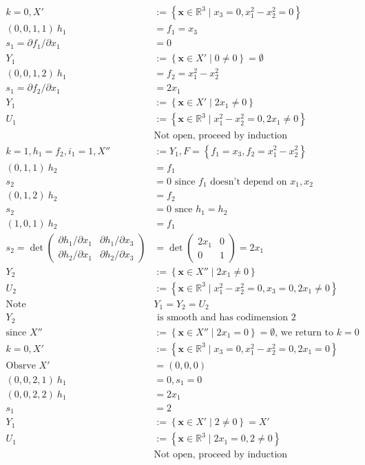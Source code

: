 \documentclass[
]{book}
\theoremstyle{definition}
\theoremstyle{definition}
\theoremstyle{definition}
\theoremstyle{definition}
\theoremstyle{remark}
\begin{document}
\begin{align}
k=0,X'&:=\left\{ \mathbf{x}\in\mathbb{R}^{3}\mid x_{3}=0,x_{1}^{2}-x_{2}^{2}=0\right\} \\\left(0,0,1,1\right)\ h_{1}&=f_{1}=x_{3}\\s_{1}=\partial f_{1}/\partial x_{1}&=0\\Y_{1}&:=\left\{ \mathbf{x}\in X'\mid0\ne0\right\} =\emptyset\\(0,0,1,2)\ h_{1}&=f_{2}=x_{1}^{2}-x_{2}^{2}\\s_{1}=\partial f_{2}/\partial x_{1}&=2x_{1}\\Y_{1}&:=\left\{ \mathbf{x}\in X'\mid2x_1\ne0\right\} \\U_{1}&:=\left\{ \mathbf{x}\in\mathbb{R}^{3}\mid x_{1}^{2}-x_{2}^{2}=0,2x_{1}\ne0\right\} \\&\text{Not open, proceed by induction}\\
k=1,h_{1}=f_{2},i_{1}=1,X''&:=Y_{1},F=\left\{ f_{1}=x_{3},f_{2}=x_{1}^{2}-x_{2}^{2}\right\} \\\left(0,1,1\right)\ h_{2}&=f_{1}\\s_{2}&=0\text{ since }f_{1}\text{ doesn't depend on }x_{1},x_{2}\\\left(0,1,2\right)\ h_{2}&=f_{2}\\s_{2}&=0\text{ snce }h_{1}=h_{2}\\\left(1,0,1\right)\ h_{2}&=f_{1}\\s_{2}=\det\begin{pmatrix}\partial h_{1}/\partial x_{1} & \partial h_{1}/\partial x_{3}\\
\partial h_{2}/\partial x_{1} & \partial h_{2}/\partial x_{3}
\end{pmatrix}&=\det\begin{pmatrix}2x_{1} & 0\\
0 & 1
\end{pmatrix}=2x_{1}\\Y_{2}&:=\left\{ \mathbf{x}\in X''\mid2x_{1}\ne0\right\}\\U_{2}&:=\left\{ \mathbf{x}\in\mathbb{R}^{3}\mid x_{1}^{2}-x_{2}^{2}=0,x_{3}=0,2x_{1}\ne0\right\} \\\text{Note }&Y_{1}=Y_{2}=U_{2}\\Y_{2}&\text{ is smooth and has codimension }2\\\text{since }X''&:=\left\{ \mathbf{x}\in X''\mid2x_{1}=0\right\} =\emptyset\text{, we return to }k=0\\k=0,X'&:=\left\{ \mathbf{x}\in\mathbb{R}^{3}\mid x_{3}=0,x_{1}^{2}-x_{2}^{2}=0,2x_{1}=0\right\} \\\text{Obsrve }X'&=(0,0,0)\\\left(0,0,2,1\right)\ h_{1}&=0,s_{1}=0\\\left(0,0,2,2\right)\ h_{1}&=2x_{1}\\s_{1}&=2\\Y_{1}&:=\left\{ \mathbf{x}\in X'\mid2\ne0\right\} =X'\\U_{1}&:=\left\{ \mathbf{x}\in\mathbb{R}^{3}\mid2x_{1}=0,2\ne0\right\} \\&\text{Not open, proceed by induction}\\
\end{align}
\end{document}
